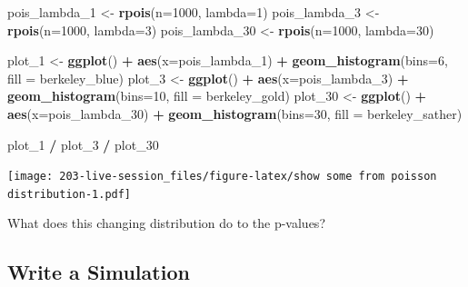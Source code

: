 \documentclass[
]{book}
\newenvironment{Shaded}{\begin{snugshade}}{\end{snugshade}}
\newcommand{\AttributeTok}[1]{\textcolor[rgb]{0.13,0.29,0.53}{#1}}
\newcommand{\DecValTok}[1]{\textcolor[rgb]{0.00,0.00,0.81}{#1}}
\newcommand{\FunctionTok}[1]{\textcolor[rgb]{0.13,0.29,0.53}{\textbf{#1}}}
\newcommand{\NormalTok}[1]{#1}
\newcommand{\OtherTok}[1]{\textcolor[rgb]{0.56,0.35,0.01}{#1}}
\newcommand{\SpecialCharTok}[1]{\textcolor[rgb]{0.81,0.36,0.00}{\textbf{#1}}}
\theoremstyle{definition}
\theoremstyle{definition}
\theoremstyle{definition}
\theoremstyle{definition}
\theoremstyle{remark}
\begin{document}
\begin{Shaded}
\begin{Highlighting}[]
\NormalTok{pois\_lambda\_1  }\OtherTok{\textless{}{-}} \FunctionTok{rpois}\NormalTok{(}\AttributeTok{n=}\DecValTok{1000}\NormalTok{, }\AttributeTok{lambda=}\DecValTok{1}\NormalTok{)}
\NormalTok{pois\_lambda\_3  }\OtherTok{\textless{}{-}} \FunctionTok{rpois}\NormalTok{(}\AttributeTok{n=}\DecValTok{1000}\NormalTok{, }\AttributeTok{lambda=}\DecValTok{3}\NormalTok{)}
\NormalTok{pois\_lambda\_30 }\OtherTok{\textless{}{-}} \FunctionTok{rpois}\NormalTok{(}\AttributeTok{n=}\DecValTok{1000}\NormalTok{, }\AttributeTok{lambda=}\DecValTok{30}\NormalTok{)}

\NormalTok{plot\_1  }\OtherTok{\textless{}{-}} \FunctionTok{ggplot}\NormalTok{() }\SpecialCharTok{+} \FunctionTok{aes}\NormalTok{(}\AttributeTok{x=}\NormalTok{pois\_lambda\_1) }\SpecialCharTok{+} \FunctionTok{geom\_histogram}\NormalTok{(}\AttributeTok{bins=}\DecValTok{6}\NormalTok{, }\AttributeTok{fill =}\NormalTok{ berkeley\_blue)}
\NormalTok{plot\_3  }\OtherTok{\textless{}{-}} \FunctionTok{ggplot}\NormalTok{() }\SpecialCharTok{+} \FunctionTok{aes}\NormalTok{(}\AttributeTok{x=}\NormalTok{pois\_lambda\_3) }\SpecialCharTok{+} \FunctionTok{geom\_histogram}\NormalTok{(}\AttributeTok{bins=}\DecValTok{10}\NormalTok{, }\AttributeTok{fill =}\NormalTok{ berkeley\_gold)}
\NormalTok{plot\_30 }\OtherTok{\textless{}{-}} \FunctionTok{ggplot}\NormalTok{() }\SpecialCharTok{+} \FunctionTok{aes}\NormalTok{(}\AttributeTok{x=}\NormalTok{pois\_lambda\_30) }\SpecialCharTok{+} \FunctionTok{geom\_histogram}\NormalTok{(}\AttributeTok{bins=}\DecValTok{30}\NormalTok{, }\AttributeTok{fill =}\NormalTok{ berkeley\_sather)}

\NormalTok{plot\_1 }\SpecialCharTok{/}\NormalTok{ plot\_3 }\SpecialCharTok{/}\NormalTok{ plot\_30}
\end{Highlighting}
\end{Shaded}

\texttt{[image: 203-live-session\_files/figure-latex/show some from poisson distribution-1.pdf]}

What does this changing distribution do to the p-values?

\hypertarget{write-a-simulation}{%
\subsection{Write a Simulation}\label{write-a-simulation}}
\end{document}
